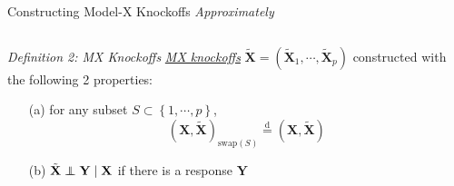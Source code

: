     \begin{frame}{Constructing Model-X Knockoffs \textit{Approximately}}
        \begin{columns}
            \begin{column}{0.95\textwidth}
                {\scriptsize
                \begin{block}{\textit{Definition 2: MX Knockoffs}}
                    \underline{\textit{MX knockoffs}} $\tilde{\mathbf{X}} = (\tilde{\mathbf{X}}_1,\cdots,\tilde{\mathbf{X}}_p)$ constructed with the following 2 properties:
                    \begin{itemize}
                        \item[(a)] for any subset $S \subset \left\{1,\cdots,p \right\}$, $$ \boxed{(\mathbf{X},\tilde{\mathbf{X}})_{\mathrm{swap}(S)} \overset{\mathrm{d}}{=}(\mathbf{X},\tilde{\mathbf{X}})} $$
                        \item[(b)] $\tilde{\mathbf{X}}\perp\!\!\!\!\perp \mathbf{Y}\mid \mathbf{X}$ if there is a response $\mathbf{Y}$
                    \end{itemize}
                \end{block}}
            \end{column}
        \end{columns}
        \vspace*{10pt}
    \end{frame}

